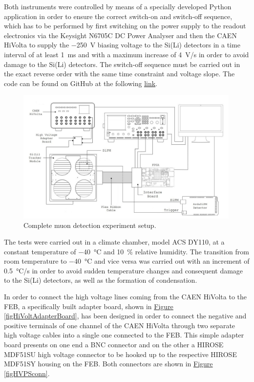 \noindent
Both instruments were controlled by means of a specially developed Python application in order to ensure the correct switch-on and switch-off sequence, which has to be performed by first switching on the power supply to the readout electronics via the Keysight N6705C DC Power Analyser and then the CAEN HiVolta to supply the \SI{-250}{\volt} biasing voltage to the Si(Li) detectors in a time interval of at least \SI{1}{\milli\second} and with a maximum increase of \SI{4}{\volt/\second} in order to avoid damage to the Si(Li) detectors. The switch-off sequence must be carried out in the exact reverse order with the same time constraint and voltage slope. The code can be found on GitHub at the following \href{https://github.com/lucaghislo/GAPS_module_setup}{\underline{link}}.

\begin{figure}[h!]
    \centering
    \includegraphics[width=0.99\textwidth]{Images/chap3/test_setup_MODULE.jpg}
    \caption{Complete muon detection experiment setup.}
    \label{figModuleSetup}
\end{figure}

\par
The tests were carried out in a climate chamber, model ACS DY110, at a constant temperature of \SI{-40}{\celsius} and \SI{10}{\percent} relative humidity. The transition from room temperature to \SI{-40}{\celsius} and vice versa was carried out with an increment of \SI{0.5}{\celsius/\second} in order to avoid sudden temperature changes and consequent damage to the Si(Li) detectors, as well as the formation of condensation.

\par
In order to connect the high voltage lines coming from the CAEN HiVolta to the FEB, a specifically built adapter board, shown in \hyperref[figHiVoltAdapterBoard]{Figure \ref{figHiVoltAdapterBoard}}, has been designed in order to connect the negative and positive terminals of one channel of the CAEN HiVolta through two separate high voltage cables into a single one connected to the FEB. This simple adapter board presents on one end a BNC connector and on the other a HIROSE MDF51SU high voltage connector to be hooked up to the respective HIROSE MDF51SY housing on the FEB. Both connectors are shown in \hyperref[figHVPSconn]{Figure \ref{figHVPSconn}}.

